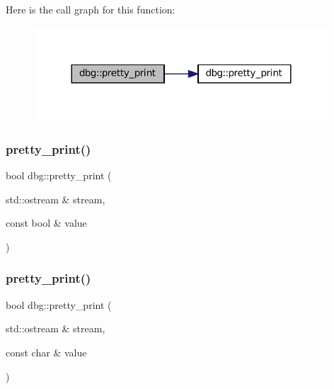 Here is the call graph for this function\+:
\nopagebreak
\begin{figure}[H]
\begin{center}
\leavevmode
\includegraphics[width=312pt]{namespacedbg_a4920208faa7096e0333f9d14119a9c2f_cgraph}
\end{center}
\end{figure}
\mbox{\label{namespacedbg_a4f9989bfef507d5034cc50d015654ca4}} 
\subsubsection{\texorpdfstring{pretty\+\_\+print()}{pretty\_print()}\hspace{0.1cm}{\footnotesize\ttfamily [4/19]}}
{\footnotesize\ttfamily bool dbg\+::pretty\+\_\+print (\begin{DoxyParamCaption}\item[{std\+::ostream \&}]{stream,  }\item[{const bool \&}]{value }\end{DoxyParamCaption})\hspace{0.3cm}{\ttfamily [inline]}}

\mbox{\label{namespacedbg_acc6a678f0c3954671e247468e249e5a4}} 
\subsubsection{\texorpdfstring{pretty\+\_\+print()}{pretty\_print()}\hspace{0.1cm}{\footnotesize\ttfamily [5/19]}}
{\footnotesize\ttfamily bool dbg\+::pretty\+\_\+print (\begin{DoxyParamCaption}\item[{std\+::ostream \&}]{stream,  }\item[{const char \&}]{value }\end{DoxyParamCaption})\hspace{0.3cm}{\ttfamily [inline]}}

